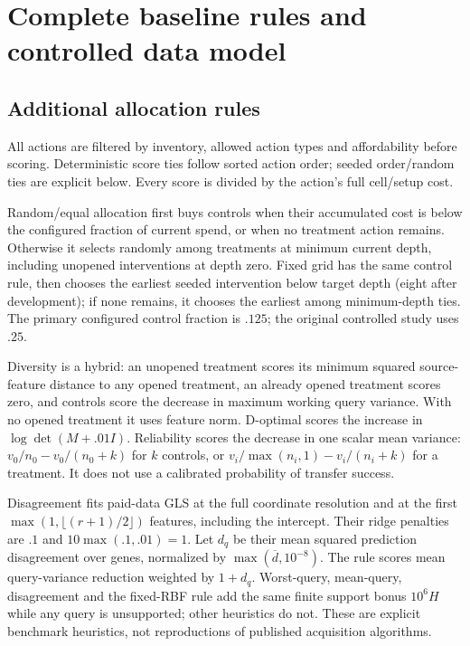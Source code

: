 \section{Complete baseline rules and controlled data model}
\label{app:baselines}
\subsection{Additional allocation rules}
All actions are filtered by inventory, allowed action types and affordability before scoring. Deterministic score ties follow sorted action order; seeded order/random ties are explicit below. Every score is divided by the action's full cell/setup cost.

Random/equal allocation first buys controls when their accumulated cost is below the configured fraction of current spend, or when no treatment action remains. Otherwise it selects randomly among treatments at minimum current depth, including unopened interventions at depth zero. Fixed grid has the same control rule, then chooses the earliest seeded intervention below target depth (eight after development); if none remains, it chooses the earliest among minimum-depth ties. The primary configured control fraction is $.125$; the original controlled study uses $.25$.

Diversity is a hybrid: an unopened treatment scores its minimum squared source-feature distance to any opened treatment, an already opened treatment scores zero, and controls score the decrease in maximum working query variance. With no opened treatment it uses feature norm. D-optimal scores the increase in $\log\det(M+.01I)$. Reliability scores the decrease in one scalar mean variance: $v_0/n_0-v_0/(n_0+k)$ for $k$ controls, or $v_i/\max(n_i,1)-v_i/(n_i+k)$ for a treatment. It does not use a calibrated probability of transfer success.

Disagreement fits paid-data GLS at the full coordinate resolution and at the first $\max(1,\lfloor(r+1)/2\rfloor)$ features, including the intercept. Their ridge penalties are $.1$ and $10\max(.1,.01)=1$. Let $d_q$ be their mean squared prediction disagreement over genes, normalized by $\max(\overline d,10^{-8})$. The rule scores mean query-variance reduction weighted by $1+d_q$. Worst-query, mean-query, disagreement and the fixed-RBF rule add the same finite support bonus $10^6H$ while any query is unsupported; other heuristics do not. These are explicit benchmark heuristics, not reproductions of published acquisition algorithms.

